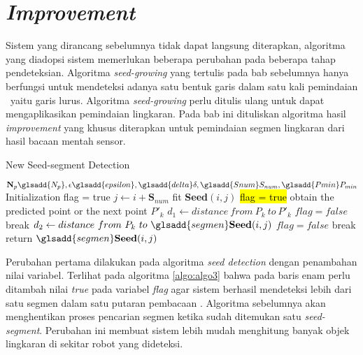 \section{\textit{Improvement}}
\label{sec:improvement}
Sistem yang dirancang sebelumnya tidak dapat langsung diterapkan, algoritma yang diadopsi sistem memerlukan beberapa perubahan pada beberapa tahap pendeteksian. Algoritma \textit{seed-growing} yang tertulis pada bab sebelumnya hanya berfungsi untuk mendeteksi adanya satu bentuk garis dalam satu kali pemindaian \lidar\ yaitu garis lurus. Algoritma \textit{seed-growing} perlu ditulis ulang untuk dapat mengaplikasikan pemindaian lingkaran. Pada bab ini dituliskan algoritma hasil \textit{improvement} yang khusus diterapkan untuk pemindaian segmen lingkaran dari hasil bacaan mentah sensor.

\begin{algorithm}[H]
    \caption{New Seed-segment Detection} 
    \label{algo:algo3}
    \begin{algorithmic}[1]
        \Require $\textbf{N}_{p}\glsadd{N_p},\epsilon\glsadd{epsilon}, \glsadd{delta}\delta, \glsadd{Snum}S_{num}, \glsadd{Pmin}P_{min}$  
        \State Initialization flag = true
            \State $j \gets i + \textbf{S}_{num}$
            \State fit \textbf{Seed}$(i,j)$
                \State \hl{flag = true}
                \State obtain the predicted point or the next point $P'_{k}$
                \State $d_{1} \gets distance\ from\ P_{k}\ to\ P'_{k}$
                    \State $flag=false$
                    \State break
                \EndIf
                \State $d_{2}\gets distance\ from\ P_{k}\ to\ \glsadd{segmen}\textbf{Seed} (i,j)$
                    \State $flag = false$
                    \State break
                \EndIf 
            \EndFor
                \State return $\glsadd{segmen}\textbf{Seed} (i,j)$
            \EndIf
        \EndFor
    \end{algorithmic} 
\end{algorithm}

Perubahan pertama dilakukan pada algoritma \textit{seed detection} dengan penambahan nilai variabel. Terlihat pada algoritma \ref*{algo:algo3} bahwa pada baris enam perlu ditambah nilai \textit{true} pada variabel \textit{flag} agar sistem berhasil mendeteksi lebih dari satu segmen dalam satu putaran pembacaan \lidar. Algoritma sebelumnya akan menghentikan proses pencarian segmen ketika sudah ditemukan satu \textit{seed-segment}. Perubahan ini membuat sistem lebih mudah menghitung banyak objek lingkaran di sekitar robot yang dideteksi.


